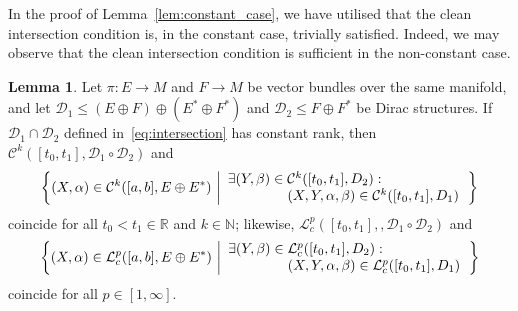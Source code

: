 \documentclass[preprint,12pt]{elsarticle}
\theoremstyle{definition}
\newtheorem{lemma}[theorem]{Lemma}
\newcommand{\set}[1]{\left\lbrace #1\right\rbrace}
\begin{document}
In the proof of Lemma~\ref{lem:constant_case}, we have utilised that the clean intersection condition is, in the constant case, trivially satisfied. Indeed, we may observe that the clean intersection condition is sufficient in the non-constant case.

\begin{lemma}\label{lem:non_constant_case}
Let $\pi:E\to M$ and $F\to M$ be vector bundles over the same manifold, and let $\mathcal{D}_1\leq (E\oplus F)\oplus(E^*\oplus F^*)$ and $\mathcal{D}_2\leq F\oplus F^*$ be Dirac structures. If $\mathcal{D}_1\cap\mathcal{D}_2$ defined in~\eqref{eq:intersection} has constant rank, then $\mathcal{C}^k([t_0,t_1],\mathcal{D}_1\circ\mathcal{D}_2)$ and
\begin{align*}
\set{(X,\alpha)\in\mathcal{C}^k([a,b],E\oplus E^*)\,\left\vert
\begin{array}{l}
\exists (Y,\beta)\in\mathcal{C}^k([t_0,t_1],D_2):\\
\hspace*{1.5cm}(X,Y,\alpha,\beta)\in\mathcal{C}^k([t_0,t_1],D_1)
\end{array}
\right.}
\end{align*}
coincide for all $t_0<t_1\in\mathbb{R}$ and $k\in\mathbb{N}$; likewise, $\mathcal{L}^p_c([t_0,t_1],,\mathcal{D}_1\circ\mathcal{D}_2)$ and
\begin{align*}
\set{(X,\alpha)\in\mathcal{L}^p_c([a,b],E\oplus E^*)\,\left\vert
\begin{array}{l}
\exists (Y,\beta)\in\mathcal{L}^p_c([t_0,t_1],D_2):\\
\hspace*{1.5cm}(X,Y,\alpha,\beta)\in\mathcal{L}^p_c([t_0,t_1],D_1)
\end{array}
\right.}
\end{align*}
coincide for all $p\in[1,\infty]$.
\end{lemma}
\end{document}
